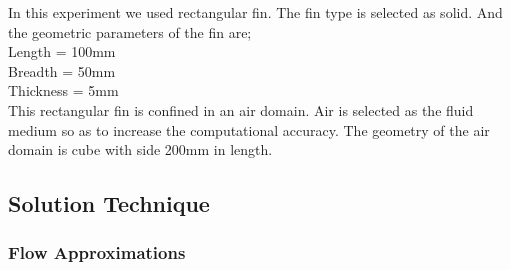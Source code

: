 In this experiment we used rectangular fin. The fin type is selected as solid.
And the geometric parameters of the fin are; \\
Length			=     100mm \\
Breadth 		=      50mm \\
Thickness		=       5mm \\
This rectangular fin is confined in an air domain. Air is selected as the fluid medium so as to increase the computational accuracy.  The geometry of the air domain is cube with side 200mm in length.

\subsection{Solution Technique}
\subsubsection{Flow Approximations}
